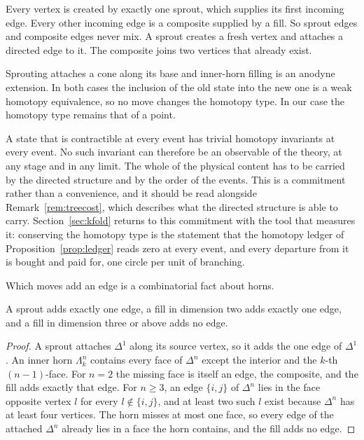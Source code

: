 Every vertex is created by exactly one sprout, which supplies its first incoming edge.
Every other incoming edge is a composite supplied by a fill.
So sprout edges and composite edges never mix.
A sprout creates a fresh vertex and attaches a directed edge to it.
The composite joins two vertices that already exist.

Sprouting attaches a cone along its base and inner-horn filling is an anodyne extension.
In both cases the inclusion of the old state into the new one is a weak homotopy equivalence, so no move changes the homotopy type.
In our case the homotopy type remains that of a point.

\begin{remark}
\label{rem:contractible}
A state that is contractible at every event has trivial homotopy invariants at every event.
No such invariant can therefore be an observable of the theory, at any stage and in any limit.
The whole of the physical content has to be carried by the directed structure and by the order of the events.
This is a commitment rather than a convenience, and it should be read alongside Remark~\ref{rem:treecost}, which describes what the directed structure is able to carry.
Section~\ref{sec:kfold} returns to this commitment with the tool that measures it: conserving the homotopy type is the statement that the homotopy ledger of Proposition~\ref{prop:ledger} reads zero at every event, and every departure from it is bought and paid for, one circle per unit of branching.
\end{remark}


Which moves add an edge is a combinatorial fact about horns.

\begin{lemma}
\label{lem:edges}
A sprout adds exactly one edge, a fill in dimension two adds exactly one edge, and a fill in dimension three or above adds no edge.
\end{lemma}

\begin{proof}
A sprout attaches $\Delta^1$ along its source vertex, so it adds the one edge of $\Delta^1$.
An inner horn $\Lambda^n_k$ contains every face of $\Delta^n$ except the interior and the $k$-th $(n-1)$-face.
For $n = 2$ the missing face is itself an edge, the composite, and the fill adds exactly that edge.
For $n \geq 3$, an edge $\{i, j\}$ of $\Delta^n$ lies in the face opposite vertex $l$ for every $l \notin \{i, j\}$, and at least two such $l$ exist because $\Delta^n$ has at least four vertices.
The horn misses at most one face, so every edge of the attached $\Delta^n$ already lies in a face the horn contains, and the fill adds no edge.
\end{proof}

